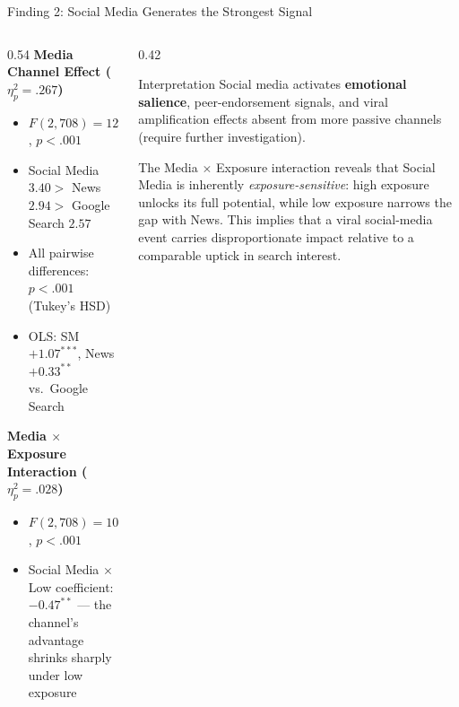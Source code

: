 \documentclass[aspectratio=169, 10pt]{beamer}
\begin{document}
\begin{frame}{Finding 2: Social Media Generates the Strongest Signal}
  \begin{columns}[T]
    \begin{column}{0.54\textwidth}
      \textbf{Media Channel Effect ($\eta^2_p = .267$)}
      \vspace{0.4em}
      \begin{itemize}
        \setlength\itemsep{0.45em}
        \item $F(2, 708) = 129.04$, $p < .001$
        \item Social Media $3.40 >$ News $2.94 >$ Google Search $2.57$
        \item All pairwise differences: $p < .001$ (Tukey's HSD)
        \item OLS: SM $+1.07^{***}$, News $+0.33^{**}$ vs.\ Google Search
      \end{itemize}
      \vspace{0.4em}
      \textbf{Media $\times$ Exposure Interaction ($\eta^2_p = .028$)}
      \vspace{0.4em}
      \begin{itemize}
        \setlength\itemsep{0.45em}
        \item $F(2, 708) = 10.20$, $p < .001$
        \item Social Media $\times$ Low coefficient: $-0.47^{**}$ — the channel's advantage shrinks sharply under low exposure
      \end{itemize}
    \end{column}
    \begin{column}{0.42\textwidth}
      \begin{block}{Interpretation}
        Social media activates \textbf{emotional salience}, peer-endorsement signals, and viral amplification effects absent from more passive channels (require further investigation).

        \vspace{0.5em}
        The Media $\times$ Exposure interaction reveals that Social Media is inherently \emph{exposure-sensitive}: high exposure unlocks its full potential, while low exposure narrows the gap with News. This implies that a viral social-media event carries disproportionate impact relative to a comparable uptick in search interest.
      \end{block}
    \end{column}
  \end{columns}
\end{frame}
\end{document}
